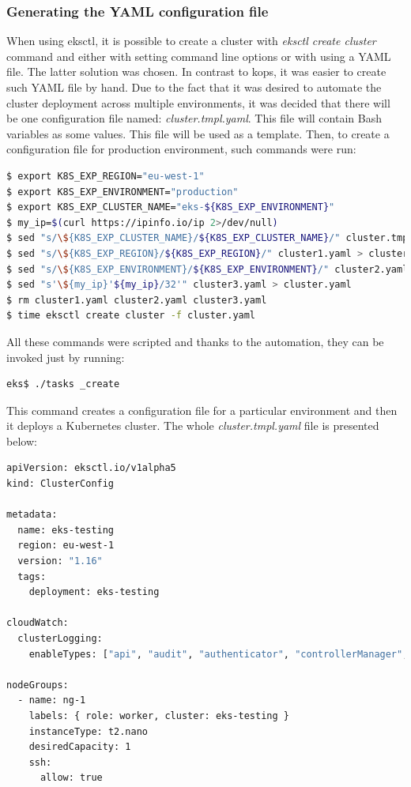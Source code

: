 \subsubsection{Generating the YAML configuration file}
When using eksctl, it is possible to create a cluster with \textit{eksctl create cluster} command and either with setting command line options or with using a YAML file. The latter solution was chosen. In contrast to kops, it was easier to create such YAML file by hand. Due to the fact that it was desired to automate the cluster deployment across multiple environments, it was decided that there will be one configuration file named: \textit{cluster.tmpl.yaml}. This file will contain Bash variables as some values. This file will be used as a template. Then, to create a configuration file for production environment, such commands were run:
\begin{lstlisting}[basicstyle=\tiny,caption={Creating eksctl configuration},captionpos=b,language=Bash,xleftmargin=1cm]
$ export K8S_EXP_REGION="eu-west-1"
$ export K8S_EXP_ENVIRONMENT="production"
$ export K8S_EXP_CLUSTER_NAME="eks-${K8S_EXP_ENVIRONMENT}"
$ my_ip=$(curl https://ipinfo.io/ip 2>/dev/null)
$ sed "s/\${K8S_EXP_CLUSTER_NAME}/${K8S_EXP_CLUSTER_NAME}/" cluster.tmpl.yaml > cluster1.yaml
$ sed "s/\${K8S_EXP_REGION}/${K8S_EXP_REGION}/" cluster1.yaml > cluster2.yaml
$ sed "s/\${K8S_EXP_ENVIRONMENT}/${K8S_EXP_ENVIRONMENT}/" cluster2.yaml > cluster3.yaml
$ sed "s'\${my_ip}'${my_ip}/32'" cluster3.yaml > cluster.yaml
$ rm cluster1.yaml cluster2.yaml cluster3.yaml
$ time eksctl create cluster -f cluster.yaml
\end{lstlisting}

All these commands were scripted and thanks to the automation, they can be invoked just by running:
\begin{lstlisting}[basicstyle=\tiny,caption={Creating a Kubernetes cluster with eksctl},captionpos=b,language=Bash,xleftmargin=1cm]
eks$ ./tasks _create
\end{lstlisting}
This command creates a configuration file for a particular environment and then it deploys a Kubernetes cluster. The whole \textit{cluster.tmpl.yaml} file is presented below:
\begin{lstlisting}[basicstyle=\tiny,caption={Eksctl configuration file},captionpos=b,language=Bash,xleftmargin=1cm]
apiVersion: eksctl.io/v1alpha5
kind: ClusterConfig

metadata:
  name: eks-testing
  region: eu-west-1
  version: "1.16"
  tags:
    deployment: eks-testing

cloudWatch:
  clusterLogging:
    enableTypes: ["api", "audit", "authenticator", "controllerManager", "scheduler"]

nodeGroups:
  - name: ng-1
    labels: { role: worker, cluster: eks-testing }
    instanceType: t2.nano
    desiredCapacity: 1
    ssh:
      allow: true

\end{lstlisting}

